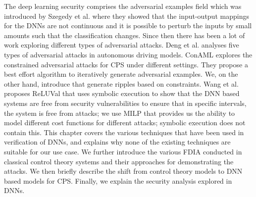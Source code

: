 The deep learning security comprises the adversarial examples field which was introduced by Szegedy et al. \cite{Szegedy2013IntriguingPO} where they showed that the input-output mappings for the DNNs are not continuous and it is possible to perturb the inputs by small amounts such that the classification changes. Since then there has been a lot of work exploring different types of adversarial attacks. Deng et al. \cite{deng2020analysis} analyses five types of adversarial attacks in autonomous driving models.  ConAML \cite{li2020conaml} explores the constrained adversarial attacks for \ac{CPS} under different settings. They propose a best effort algorithm to iteratively generate adversarial examples. We, on the other hand, introduce \attack  that generate ripples based on constraints. Wang et al. \cite{217595} proposes ReLUVal that uses symbolic execution to show that the DNN based systems are free from security vulnerabilities to ensure that in specific intervals, the system is free from attacks; we use MILP that provides us the ability to model different cost functions for different attacks; symbolic execution does not contain this. 
\newline 
\newline 
This chapter covers the various techniques that have been used in verification of DNNs, and explains why none of the existing techniques are suitable for our use case. 
We further introduce the various \ac{FDIA} conducted in classical control theory systems and their approaches for demonstrating the attacks. 
We then briefly describe the shift from control theory models to \ac{DNN} based models for \ac{CPS}.
Finally, we explain the security analysis explored in \ac{DNN}s. 
